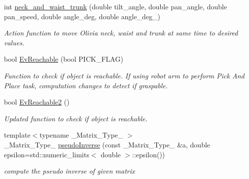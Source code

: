 \begin{DoxyCompactItemize}
int \hyperlink{structManipulate_ab9223a95d1d58d8b809d82d282ce48a8}{neck\+\_\+and\+\_\+waist\+\_\+trunk} (double tilt\+\_\+angle, double pan\+\_\+angle, double pan\+\_\+speed, double angle\+\_\+deg, double angle\+\_\+deg\+\_)
\begin{DoxyCompactList}\small\item\em Action function to move Olivia neck, waist and trunk at same time to desired values. \end{DoxyCompactList}\item 
bool \hyperlink{structManipulate_aaf55e7ba44c974f70ac925898c267e6c}{Ev\+Reachable} (bool P\+I\+C\+K\+\_\+\+F\+L\+AG)
\begin{DoxyCompactList}\small\item\em Function to check if object is reachable. If using robot arm to perform Pick And Place task, computation changes to detect if graspable. \end{DoxyCompactList}\item 
bool \hyperlink{structManipulate_ad31d1bed54184f5eb6caebc909390272}{Ev\+Reachable2} ()
\begin{DoxyCompactList}\small\item\em Updated function to check if object is reachable. \end{DoxyCompactList}\item 
{\footnotesize template$<$typename \+\_\+\+Matrix\+\_\+\+Type\+\_\+ $>$ }\\\+\_\+\+Matrix\+\_\+\+Type\+\_\+ \hyperlink{structManipulate_adcb737b1bd9ea1a621a668b09af275fb}{pseudo\+Inverse} (const \+\_\+\+Matrix\+\_\+\+Type\+\_\+ \&a, double epsilon=std\+::numeric\+\_\+limits$<$ double $>$\+::epsilon())
\begin{DoxyCompactList}\small\item\em compute the pseudo inverse of given matrix \end{DoxyCompactList}\end{DoxyCompactItemize}
